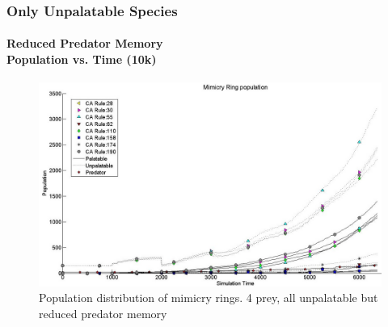 \frame
{
	\frametitle{Only Unpalatable Species}
	\framesubtitle{Reduced Predator Memory\\ Population vs. Time (10k)}

	\begin{figure}[H]
		\centering
		\includegraphics[scale=0.25]{../tex/images/simTime6k-4Prey-unp-1-mem}
		\caption{Population distribution of mimicry rings. 4 prey, all unpalatable but reduced predator memory}
		\label{fig:plot-4-prey-unp-1-mem}
	\end{figure}
}

